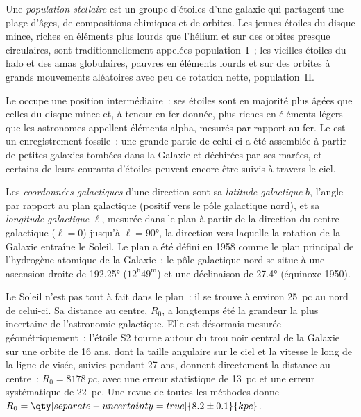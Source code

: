 \begin{definition}\label{def:b3:milky-way-galaxies:populations}
Une \emph{population stellaire} est un groupe d'étoiles
d'une galaxie qui partagent une plage d'âges, de compositions chimiques et de
orbites. Les jeunes étoiles du disque mince, riches en éléments plus lourds que
l'hélium et sur des orbites presque circulaires, sont traditionnellement appelées
population~I~; les vieilles étoiles du halo et des amas globulaires, pauvres
en éléments lourds et sur des orbites à grands mouvements aléatoires avec peu de
rotation nette, population~II.
\end{definition}

Le  occupe une position intermédiaire~: ses étoiles sont en majorité
plus âgées que celles du disque mince et, à teneur en fer donnée, plus riches en
éléments légers que les astronomes appellent éléments alpha, mesurés par rapport au fer. Le
 est un
enregistrement fossile~: une grande partie de celui-ci a été assemblée à partir de petites galaxies tombées dans
la Galaxie et déchirées par ses marées, et certains de leurs courants d'étoiles
peuvent encore être suivis à travers le ciel.

\begin{definition}\label{def:b3:milky-way-galaxies:coordinates}
Les \emph{coordonnées galactiques} d'une direction
sont sa \emph{latitude galactique} $b$, l'angle par rapport au plan galactique
(positif vers le pôle galactique nord), et sa \emph{longitude
galactique} $\ell$, mesurée dans le plan à partir de la direction du centre
galactique ($\ell = 0$) jusqu'à $\ell = \ang{90}$, la direction vers laquelle
la rotation de la Galaxie entraîne le Soleil. Le plan a été défini en 1958 comme
le plan principal de l'hydrogène atomique de la Galaxie~;
le pôle galactique nord se situe à une ascension droite de \ang{192.25}
($12^\mathrm{h}49^\mathrm{m}$) et une déclinaison de \ang{27.4} (équinoxe
1950).
\end{definition}

Le Soleil n'est pas tout à fait dans le plan~: il se trouve à environ \qty{25}{pc} au nord de celui-ci.
Sa distance au centre, $R_0$, a longtemps été la grandeur la plus incertaine de
l'astronomie galactique. Elle est désormais mesurée géométriquement~: l'étoile S2
tourne autour du trou noir central de la Galaxie sur une orbite de \num{16} ans,
dont la taille angulaire sur le ciel et la vitesse le long de la ligne de visée,
suivies pendant 27 ans, donnent directement la distance au centre~:
$R_0 = \qty{8178}{pc}$, avec une erreur statistique de \qty{13}{pc} et une
erreur systématique de \qty{22}{pc}. Une revue de toutes les méthodes donne
$R_0 = \qty[separate-uncertainty=true]{8.2 \pm 0.1}{kpc}$.

